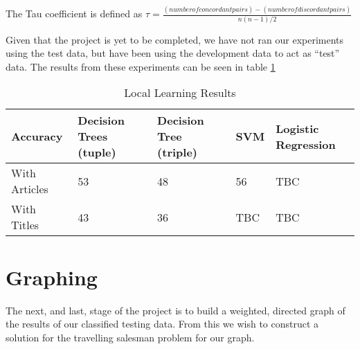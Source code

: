 \documentclass[12pt]{report}
\begin{document}
The Tau coefficient is defined as $\tau = \frac{(number of concordant pairs) - (number of discordant pairs)}{n(n-1)/2}$\cite{kendalltau}%

Given that the project is yet to be completed, we have not ran our experiments using the test data, but have been using
the development data to act as ``test'' data. The results from these experiments can be seen in table \ref{table:local-learning}
\vspace{2em}
\begin{table}[H]
\centering
\label{table:local-learning}
\begin{tabular}{|p{5em}|l|l|l|p{4em}|}
  \hline
                        {\small Accuracy}  & {\small Decision Trees (tuple)} & {\small Decision Tree (triple)} & {\small SVM}  & {\small Logistic Regression}\\
  \hline
{\small With Articles}    & 53                      & 48                      & 56 &  TBC\\
\hline
{\small With Titles} & 43                      & 36                      & TBC    & TBC\\
\hline
\end{tabular}
\caption{Local Learning Results}
\end{table}



\chapter{Graphing}
The next, and last, stage of the project is to build a weighted, directed graph of the
results of our classified testing data. From this we wish to construct a solution for
the travelling salesman problem for our graph.
\end{document}
